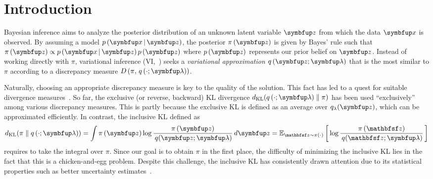 
\section{Introduction}\label{section:intro}
Bayesian inference aims to analyze the posterior distribution of an unknown latent variable \(\vz\) from which the data \(\vx\) is observed.
By assuming a model \(p\,(\vx\,|\,\vz)\), the posterior \(\pi\,(\vz)\) is given by Bayes' rule such that \(\pi\,(\vz) \propto {p\,(\vx\,|\,\vz)\,p\,(\vz)}\) where \(p\,(\vz)\) represents our prior belief on \(\vz\).
Instead of working directly with \(\pi\), variational inference (VI,~\citealt{blei_variational_2017}) seeks a \textit{variational approximation} \(q\,(\vz; \vlambda)\) that is the most similar to \(\pi\) according to a discrepancy measure \(D\,(\pi,\, q\,(\cdot; \vlambda))\).

Naturally, choosing an appropriate discrepancy measure is key to the quality of the solution.
This fact has led to a quest for suitable divergence measures~\citep{pmlr-v37-salimans15, NIPS2016_7750ca35, NIPS2017_35464c84, NEURIPS2018_1cd138d0, pmlr-v97-ruiz19a}.
So far, the exclusive (or reverse, backward)  KL divergence \(\DKL{q\left(\cdot; \vlambda\right)}{\pi}\) has been used ``exclusively'' among various discrepancy measures.
This is partly because the exclusive KL is defined as an average over \(q_{\lambda}(\vz)\), which can be approximated efficiently.
In contrast, the inclusive KL defined as
%
{%
\vspace{-0.05in}
\begin{align*}
  \DKL{\pi}{q\left(\cdot; \vlambda\right)}
  = \int \pi\,(\vz) \log \frac{\pi\left(\vz\right)}{\,q(\vz; \vlambda)} \,d\vz
  = \Esub{\rvvz \sim \pi\left(\cdot\right)}{\log \frac{\pi\left(\rvvz\right)}{\,q(\rvvz; \vlambda)} } %
\end{align*}
}%
%
requires to take the integral over \(\pi\).
Since our goal is to obtain \(\pi\) in the first place, the difficulty of minimizing the inclusive KL lies in the fact that this is a chicken-and-egg problem.
Despite this challenge, the inclusive KL has consistently drawn attention due to its statistical properties such as better uncertainty estimates~\citep{minka2005divergence, mackay_local_2001}.

